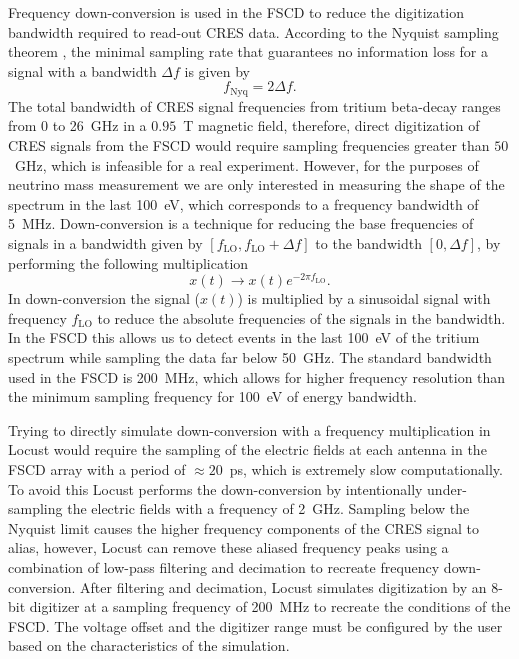 Frequency down-conversion is used in the FSCD to reduce the digitization bandwidth required to read-out CRES data. According to the Nyquist sampling theorem \cite{nyquist_sampling}, the minimal sampling rate that guarantees no information loss for a signal with a bandwidth $\Delta f$ is given by
\begin{equation}
    f_{\textrm{Nyq}}=2\Delta f.
\end{equation}
The total bandwidth of CRES signal frequencies from tritium beta-decay ranges from 0 to 26~GHz in a $0.95$~T magnetic field, therefore, direct digitization of CRES signals from the FSCD would require sampling frequencies greater than $50$~GHz, which is infeasible for a real experiment. However, for the purposes of neutrino mass measurement we are only interested in measuring the shape of the spectrum in the last 100~eV, which corresponds to a frequency bandwidth of 5~MHz. Down-conversion is a technique for reducing the base frequencies of signals in a bandwidth given by $[f_\textrm{LO},f_\textrm{LO}+\Delta f]$ to the bandwidth $[0, \Delta f]$, by performing the following multiplication
\begin{equation}
    x(t)\rightarrow x(t)e^{-2\pi f_\textrm{LO}}.
\end{equation}
In down-conversion the signal ($x(t)$) is multiplied by a sinusoidal signal with frequency $f_\textrm{LO}$ to reduce the absolute frequencies of the signals in the bandwidth. In the FSCD this allows us to detect events in the last 100~eV of the tritium spectrum while sampling the data far below 50~GHz. The standard bandwidth used in the FSCD is 200~MHz, which allows for higher frequency resolution than the minimum sampling frequency for 100~eV of energy bandwidth.

Trying to directly simulate down-conversion with a frequency multiplication in Locust would require the sampling of the electric fields at each antenna in the FSCD array with a period of $\approx20$~ps, which is extremely slow computationally. To avoid this Locust performs the down-conversion by intentionally under-sampling the electric fields with a frequency of 2~GHz. Sampling below the Nyquist limit causes the higher frequency components of the CRES signal to alias, however, Locust can remove these aliased frequency peaks using a combination of low-pass filtering and decimation to recreate frequency down-conversion. After filtering and decimation, Locust simulates digitization by an 8-bit digitizer at a sampling frequency of 200~MHz to recreate the conditions of the FSCD. The voltage offset and the digitizer range must be configured by the user based on the characteristics of the simulation. 

